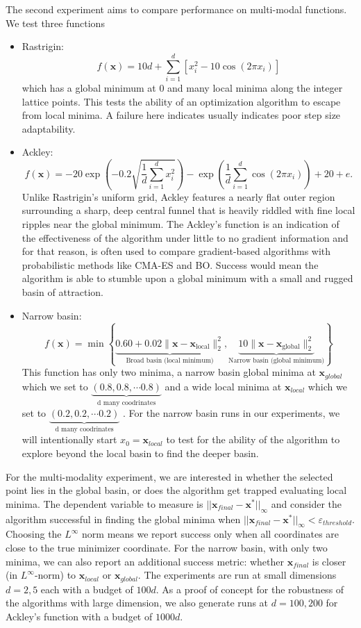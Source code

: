 \documentclass[12pt]{article}
\begin{document}
The second experiment aims to compare performance on multi-modal functions. We test three functions
\begin{itemize}
    \label{rast formula} \item Rastrigin: $$f(\mathbf{x}) = 10d + \sum_{i=1}^d \left[x_i^2 - 10\cos(2\pi x_i)\right]$$ which has a global minimum at $0$ and many local minima along the integer lattice points. This tests the ability of an optimization algorithm to escape from local minima. A failure here indicates usually indicates poor step size adaptability. 
    \item Ackley: \[f(\mathbf{x}) =-20\exp\left(-0.2\sqrt{\frac{1}{d}\sum_{i=1}^{d}x_i^2}\right)-\exp\left(\frac{1}{d}\sum_{i=1}^{d}\cos(2\pi x_i)\right)+20+e.\]
    Unlike Rastrigin's uniform grid, Ackley features a nearly flat outer region surrounding a sharp, deep central funnel that is heavily riddled with fine local ripples near the global minimum. The Ackley's function is an indication of the effectiveness of the algorithm under little to no gradient information and for that reason, is often used to compare gradient-based algorithms with probabilistic methods like CMA-ES and BO. Success would mean the algorithm is able to stumble upon a global minimum with a small and rugged basin of attraction.
    \item Narrow basin: $$f(\mathbf{x}) =\min\left\{\underbrace{0.60 + 0.02\|\mathbf{x}-\mathbf{x}_{\mathrm{local}}\|_2^2}_{\text{Broad basin (local minimum)}},\underbrace{10\|\mathbf{x}-\mathbf{x}_{\mathrm{global}}\|_2^2}_{\text{Narrow basin (global minimum)}}\right\}$$
    This function has only two minima, a narrow basin global minima at $\mathbf x_{global}$ which we set to $\underbrace{(0.8,0.8, \cdots 0.8)}_{\mathrm{d \,\,many \,\, coodrinates}}$ and a wide local minima at $\mathbf x_{local}$ which we set to $\underbrace{(0.2,0.2, \cdots 0.2)}_{\mathrm{d \,\,many \,\, coodrinates}}$ . For the narrow basin runs in our experiments, we will intentionally start $x_0 = \mathbf{x}_{local}$ to test for the ability of the algorithm to explore beyond the local basin to find the deeper basin.
\end{itemize}

For the multi-modality experiment, we are interested in whether the selected point lies in the global basin, or does the algorithm get trapped evaluating local minima. The dependent variable to measure is $||\mathbf{x}_{final} - \mathbf{x}^*||_\infty$ and consider the algorithm successful in finding the global minima when $||\mathbf{x}_{final} - \mathbf{x}^*||_\infty < \varepsilon_{threshold}$. Choosing the $L^\infty$ norm means we report success only when all coordinates are close to the true minimizer coordinate. For the narrow basin, with only two minima, we can also report an additional success metric: whether $\mathbf{x}_{final}$ is closer (in $L^\infty$-norm) to $\mathbf{x}_{local}$ or $\mathbf{x}_{global}$. The experiments are run at small dimensions $d = 2,5$ each with a budget of $100d$. As a proof of concept for the robustness of the algorithms with large dimension, we also generate runs at $d=100,200$ for Ackley's function with a budget of $1000d$.\\
\end{document}
